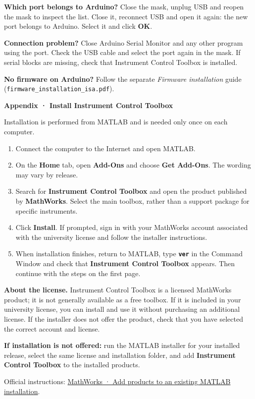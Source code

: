 \documentclass[11pt,a4paper]{article}
\begin{document}
\textbf{Which port belongs to Arduino?} Close the mask, unplug USB and reopen the mask to inspect the list. Close it, reconnect USB and open it again: the new port belongs to Arduino. Select it and click \textbf{OK}.

\textbf{Connection problem?} Close Arduino Serial Monitor and any other program using the port. Check the USB cable and select the port again in the mask. If serial blocks are missing, check that Instrument Control Toolbox is installed.

\textbf{No firmware on Arduino?} Follow the separate \emph{Firmware installation} guide (\texttt{firmware\_installation\_isa.pdf}).

\clearpage
{\LARGE\bfseries\color{isa} Appendix · Install Instrument Control Toolbox}\par
\medskip
Installation is performed from MATLAB and is needed only once on each computer.
\begin{enumerate}
\item Connect the computer to the Internet and open MATLAB.
\item On the \textbf{Home} tab, open \textbf{Add-Ons} and choose \textbf{Get Add-Ons}. The wording may vary by release.
\item Search for \textbf{Instrument Control Toolbox} and open the product published by \textbf{MathWorks}. Select the main toolbox, rather than a support package for specific instruments.
\item Click \textbf{Install}. If prompted, sign in with your MathWorks account associated with the university license and follow the installer instructions.
\item When installation finishes, return to MATLAB, type \textbf{\texttt{ver}} in the Command Window and check that \textbf{Instrument Control Toolbox} appears. Then continue with the steps on the first page.
\end{enumerate}

\textbf{About the license.} Instrument Control Toolbox is a licensed MathWorks product; it is not generally available as a free toolbox. If it is included in your university license, you can install and use it without purchasing an additional license. If the installer does not offer the product, check that you have selected the correct account and license.

\textbf{If installation is not offered:} run the MATLAB installer for your installed release, select the same license and installation folder, and add \textbf{Instrument Control Toolbox} to the installed products.

\smallskip
{\small Official instructions: \href{https://www.mathworks.com/help/install/ug/add-to-existing-installation.html}{MathWorks · Add products to an existing MATLAB installation}.}
\end{document}
